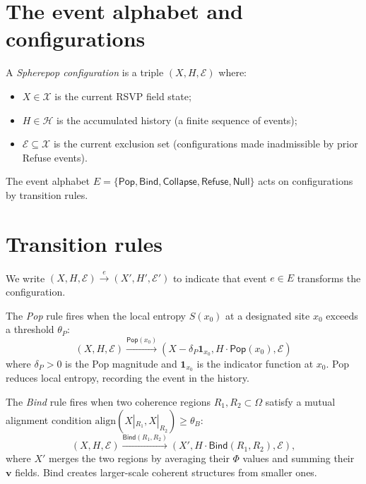 \documentclass[12pt, oneside]{memoir}
\newcommand{\X}{\mathcal{X}}
\newcommand{\Hcal}{\mathcal{H}}
\newcommand{\bv}{\mathbf{v}}
\begin{document}
\section{The event alphabet and configurations}

\begin{definition}
\label{def:sp-config}
A \emph{Spherepop configuration} is a triple $(X, H, \mathcal{E})$ where:
\begin{itemize}
  \item $X \in \X$ is the current RSVP field state;
  \item $H \in \Hcal$ is the accumulated history (a finite sequence of events);
  \item $\mathcal{E} \subseteq \X$ is the current exclusion set (configurations made
        inadmissible by prior Refuse events).
\end{itemize}
\end{definition}

The event alphabet $E = \{\mathsf{Pop}, \mathsf{Bind}, \mathsf{Collapse},
\mathsf{Refuse}, \mathsf{Null}\}$ acts on configurations by transition rules.

\section{Transition rules}

We write $(X, H, \mathcal{E}) \xrightarrow{e} (X', H', \mathcal{E}')$ to indicate that
event $e \in E$ transforms the configuration.

\begin{definition}
\label{def:pop}
The \emph{Pop} rule fires when the local entropy $S(x_0)$ at a designated site $x_0$
exceeds a threshold $\theta_P$:
\[
  (X, H, \mathcal{E}) \xrightarrow{\mathsf{Pop}(x_0)}
  (X - \delta_P \mathbf{1}_{x_0}, H \cdot \mathsf{Pop}(x_0), \mathcal{E})
\]
where $\delta_P > 0$ is the Pop magnitude and $\mathbf{1}_{x_0}$ is the indicator
function at $x_0$.  Pop reduces local entropy, recording the event in the history.
\end{definition}

\begin{definition}
\label{def:bind}
The \emph{Bind} rule fires when two coherence regions $R_1, R_2 \subset \Omega$ satisfy
a mutual alignment condition $\mathrm{align}(X|_{R_1}, X|_{R_2}) \ge \theta_B$:
\[
  (X, H, \mathcal{E}) \xrightarrow{\mathsf{Bind}(R_1, R_2)}
  (X', H \cdot \mathsf{Bind}(R_1, R_2), \mathcal{E}),
\]
where $X'$ merges the two regions by averaging their $\Phi$ values and summing their
$\bv$ fields.  Bind creates larger-scale coherent structures from smaller ones.
\end{definition}
\end{document}
